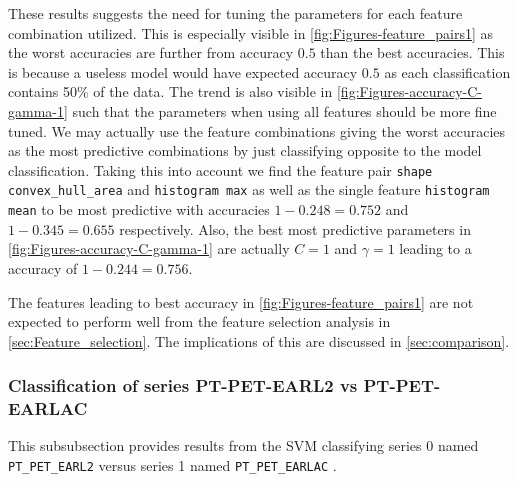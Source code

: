 These results suggests the need for tuning the parameters for each feature combination utilized. 
This is especially visible in \autoref{fig:Figures-feature_pairs1} as the worst accuracies are further from accuracy $0.5$ than 
the best accuracies. This is because a useless model would have expected accuracy $0.5$ as each classification contains 50\% of the data. 
The trend is also visible in \autoref{fig:Figures-accuracy-C-gamma-1} such that the parameters when using all features 
should be more fine tuned. We may actually use the feature combinations giving the worst accuracies as the most predictive combinations 
by just classifying opposite to the model classification. Taking this into account we find 
the feature pair \verb|shape convex_hull_area| and \verb|histogram max| as well as the single feature 
\verb|histogram mean| to be most predictive with accuracies $1-0.248=0.752$ and $1-0.345=0.655$ respectively.  
Also, the best most predictive parameters in \autoref{fig:Figures-accuracy-C-gamma-1} are actually $C=1$ and $\gamma =1$
leading to a accuracy of $1-0.244=0.756$.  

The features leading to best accuracy in \autoref{fig:Figures-feature_pairs1} are not expected to perform well from the feature selection 
analysis in \autoref{sec:Feature_selection}. The implications of this are discussed in \autoref{sec:comparison}.  





\subsubsection{Classification of series PT-PET-EARL2 vs PT-PET-EARLAC}
\label{sec:SVM2}
This subsubsection provides results from the SVM classifying series 0 named \verb|PT_PET_EARL2|
versus series 1 named \verb|PT_PET_EARLAC| . 


